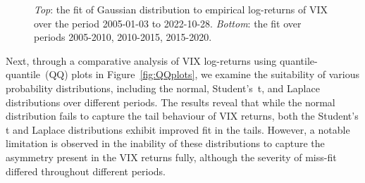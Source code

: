 \begin{figure}[htbp]
\begin{subfigure}[b]{\textwidth}
    \end{subfigure}
    \caption{\textit{Top}: the fit of Gaussian distribution to empirical log-returns of VIX over the period 2005-01-03 to 2022-10-28. \textit{Bottom}: the fit over periods 2005-2010, 2010-2015, 2015-2020.}
    \label{fig:VIX_dist}
\end{figure}

Next, through a comparative analysis of VIX log-returns using quantile-quantile~(QQ) plots in Figure~\ref{fig:QQplots}, we examine the suitability of various probability distributions, including the normal, Student's~t, and Laplace distributions over different periods. The results reveal that while the normal distribution fails to capture the tail behaviour of VIX returns, both the Student's t and Laplace distributions exhibit improved fit in the tails. However, a notable limitation is observed in the inability of these distributions to capture the asymmetry present in the VIX returns fully, although the severity of miss-fit differed throughout different periods.


